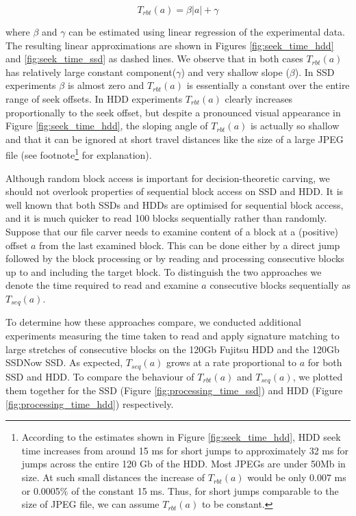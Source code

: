 \documentclass[final,5p,times,twocolumn,authoryear]{elsarticle}
\begin{document}
\begin{equation} \label{eq:tproc-eq}
T_{rbt}(a)=\beta |a|+\gamma
\end{equation}

where $\beta$ and $\gamma$ can be estimated using linear regression of the experimental data. The resulting linear approximations are shown in Figures \ref{fig:seek_time_hdd} and \ref{fig:seek_time_ssd} as dashed lines. We observe that in both cases $T_{rbt}(a)$ has relatively large constant component($\gamma$) and very shallow slope ($\beta$). In SSD experiments $\beta$ is almost zero and $T_{rbt}(a)$ is essentially a constant over the entire range of seek offsets. In HDD experiments $T_{rbt}(a)$ clearly increases proportionally to the seek offset, but despite a pronounced visual appearance in Figure \ref{fig:seek_time_hdd}, the sloping angle of $T_{rbt}(a)$ is actually so shallow and that it can be ignored at short travel distances like the size of a large JPEG file (see footnote\footnote{According to the estimates shown in Figure \ref{fig:seek_time_hdd}, HDD seek time increases from around 15 ms for short jumps to approximately 32 ms for jumps across the entire 120 Gb of the HDD. Most JPEGs are under 50Mb in size. At such small distances the increase of $T_{rbt}(a)$ would be only 0.007 ms or 0.0005\% of the constant 15 ms. Thus, for short jumps comparable to the size of JPEG file, we can assume $T_{rbt}(a)$ to be constant.} for explanation).

Although random block access is important for decision-theoretic carving, we should not overlook properties of sequential block access on SSD and HDD. It is well known that both SSDs and HDDs are optimised for sequential block access, and it is much quicker to read 100 blocks sequentially rather than randomly. Suppose that our file carver needs to examine content of a block at a (positive) offset $a$ from the last examined block. This can be done either by a direct jump followed by the block processing or by reading and processing consecutive blocks up to and including the target block. To distinguish the two approaches we denote the time required to read and examine $a$ consecutive blocks sequentially as $T_{seq}(a)$.

To determine how these approaches compare, we conducted additional experiments measuring the time taken to read and apply signature matching to large stretches of consecutive blocks on the 120Gb Fujitsu HDD and the 120Gb SSDNow SSD. As expected, $T_{seq}(a)$ grows at a rate proportional to $a$ for both SSD and HDD. To compare the behaviour of $T_{rbt}(a)$ and $T_{seq}(a)$, we plotted them together for the SSD (Figure \ref{fig:processing_time_ssd}) and HDD (Figure \ref{fig:processing_time_hdd}) respectively. 
\end{document}
